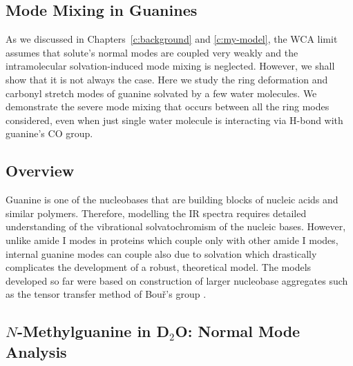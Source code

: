 \documentclass[b5paper,oneside,fleqn,11pt]{book}
\begin{document}
\begin{refsection}
\chapter{Mode Mixing in Guanines\label{c:mode-mixing-guanines}}

As we discussed in Chapters~\ref{c:background} and \ref{c:my-model}, 
the WCA limit assumes
that solute's normal modes are coupled very weakly and the intramolecular
solvation\hyp{}induced mode mixing is neglected. However, we shall
show that it is not always the case. Here we study the ring deformation
and carbonyl stretch modes of guanine solvated by a few water
molecules. We demonstrate the severe mode mixing that occurs
between all the ring modes considered, even when just single water molecule
is interacting via H-bond with guanine's CO group. 

\section{Overview}

Guanine is one of the nucleobases that are building blocks of
nucleic acids and similar polymers. \citep{Limongelli.DeTito.Cerofolini.Fragai.Pagano.Trotta.Cosconati.Marinelli.Novellino.Bertini.Randazzo.Luchinat.Parrinello.Angew.2013,
Peng.Jones.Tokmakoff.JACS.2011} Therefore, modelling the
IR spectra requires detailed understanding of the vibrational
solvatochromism of the nucleic bases. However, unlike amide I modes
in proteins which couple only with other amide I modes, 
internal guanine modes can couple also due to solvation
which drastically complicates the development of a robust, 
theoretical model. The models developed so far were based
on construction of larger nucleobase aggregates such as
the tensor transfer method of Bou\v{r}'s group \citep{Bour.Sopkova.Bednarova.Malon.Keiderling.JCC.1997,
Andrushchenko.Tsankov.Krasteva.Wieser.Bour.JACS.2011}.

\section{$N$-Methylguanine in D$_2$O: Normal Mode Analysis}


\end{refsection}
\end{document}
